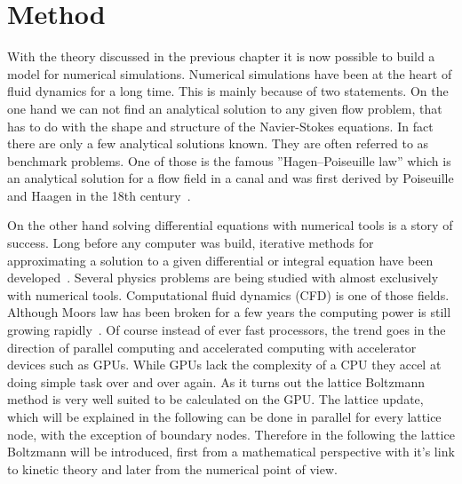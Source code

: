 \chapter{Method}
\label{chapter:method}
With the theory discussed in the previous chapter it is now possible to build a model for numerical simulations.
Numerical simulations have been at the heart of fluid dynamics for a long time.
This is mainly because of two statements.
On the one hand we can not find an analytical solution to any given flow problem, that has to do with the shape and structure of the Navier-Stokes equations.
In fact there are only a few analytical solutions known. 
They are often referred to as benchmark problems.
One of those is the famous ''Hagen–Poiseuille law'' which is an analytical solution for a flow field in a canal and was first derived by Poiseuille and Haagen in the 18th century~\cite{sutera1993history}.

On the other hand solving differential equations with numerical tools is a story of success.
Long before any computer was build, iterative methods for approximating a solution to a given differential or integral equation have been developed~\cite{}.
Several physics problems are being studied with almost exclusively with numerical tools.
Computational fluid dynamics (CFD) is one of those fields.
Although Moors law has been broken for a few years the computing power is still growing rapidly~\cite{591665}.
Of course instead of ever fast processors, the trend goes in the direction of parallel computing and accelerated computing with accelerator devices such as GPUs.
While GPUs lack the complexity of a CPU they accel at doing simple task over and over again.
As it turns out the lattice Boltzmann method is very well suited to be calculated on the GPU.
The lattice update, which will be explained in the following can be done in parallel for every lattice node, with the exception of boundary nodes.
Therefore in the following the lattice Boltzmann will be introduced, first from a mathematical perspective with it's link to kinetic theory and later from the numerical point of view.

